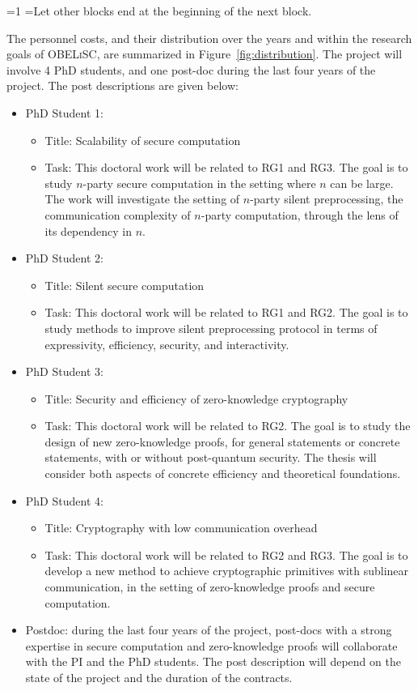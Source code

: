 \documentclass[oneside, a4paper, onecolumn, 11pt]{article}
\newcommand{\OBELiSC}{\textsc{OBELiSC}\xspace}
\newcounter{alphasect}
\def\alphainsection{0}
\newenvironment{alphasection}{%
  \ifnum\alphainsection=1%
    \errhelp={Let other blocks end at the beginning of the next block.}
    \errmessage{Nested Alpha section not allowed}
  \fi%
  \setcounter{alphasect}{0}
  \def\alphainsection{1}
}{%
  \setcounter{alphasect}{0}
  \def\alphainsection{0}
}%
\begin{document}
\begin{alphasection}
The personnel costs, and their distribution over the years and within the research goals of \OBELiSC, are summarized in Figure~\ref{fig:distribution}. The project will involve 4 PhD students, and one post-doc during the last four years of the project. The post descriptions are given below:\\

\begin{itemize}
    \item PhD Student 1:
    \begin{itemize}
        \item Title: Scalability of secure computation
        \item Task: This doctoral work will be related to RG1 and RG3. The goal is to study $n$-party secure computation in the setting where $n$ can be large. The work will investigate the setting of $n$-party silent preprocessing, the communication complexity of $n$-party computation, through the lens of its dependency in $n$.
    \end{itemize}
    \item PhD Student 2: 
        \begin{itemize}
        \item Title: Silent secure computation
        \item Task: This doctoral work will be related to RG1 and RG2. The goal is to study methods to improve silent preprocessing protocol in terms of expressivity, efficiency, security, and interactivity.
    \end{itemize}
    \item PhD Student 3: 
        \begin{itemize}
        \item Title: Security and efficiency of zero-knowledge cryptography
        \item Task: This doctoral work will be related to RG2. The goal is to study the design of new zero-knowledge proofs, for general statements or concrete statements, with or without post-quantum security. The thesis will consider both aspects of concrete efficiency and theoretical foundations.
    \end{itemize}
    \item PhD Student 4: 
        \begin{itemize}
        \item Title: Cryptography with low communication overhead
        \item Task: This doctoral work will be related to RG2 and RG3. The goal is to develop a new method to achieve cryptographic primitives with sublinear communication, in the setting of zero-knowledge proofs and secure computation.
    \end{itemize}
    \item Postdoc: during the last four years of the project, post-docs with a strong expertise in secure computation and zero-knowledge proofs will collaborate with the PI and the PhD students. The post description will depend on the state of the project and the duration of the contracts.
\end{itemize}
\fi
\end{alphasection}
\begin{small}
  

\end{small}
\end{document}
